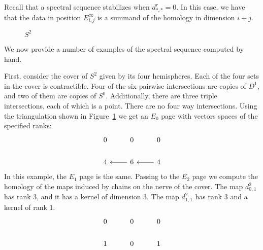 Recall that a spectral sequence stabilizes when $d^r_{*,*} = 0$. In this case, we have that the data in position $E^\infty_{i,j}$ is a summand of the homology in dimension $i+j$. 
\begin{figure}
\centering
{}
\caption{$S^2$}
\label{fig:S2-triangulation}
\end{figure}
We now provide a number of examples of the spectral sequence computed by hand.
\begin{example}
First, consider the cover of $S^2$ given by its four hemispheres. Each of the four sets in the cover is contractible. Four of the six pairwise intersections are copies of $D^1$, and two of them are copies of $S^0$. Additionally, there are three triple intersections, each of which is a point. There are no four way intersections. Using the triangulation shown in Figure~\ref{fig:S2-triangulation} we get an $E_0$ page with vectors spaces of the specified ranks:
\[ \begin{tikzcd}
0    &  0     &   0   \\
4    & \arrow{l}  6     & \arrow{l}   4
\end{tikzcd} \]
In this example, the $E_1$ page is the same.
Passing to the $E_2$ page we compute the homology of the maps induced by chains on the nerve of the cover. The map $d^2_{0,1}$ has rank 3, and it has a kernel of dimension 3. The map $d^2_{1,1}$ has rank 3 and a kernel of rank $1$.
\[ \begin{tikzcd}
0    &  0     &   0   \\
1    &  0     &   1
\end{tikzcd} \]
\end{example}

